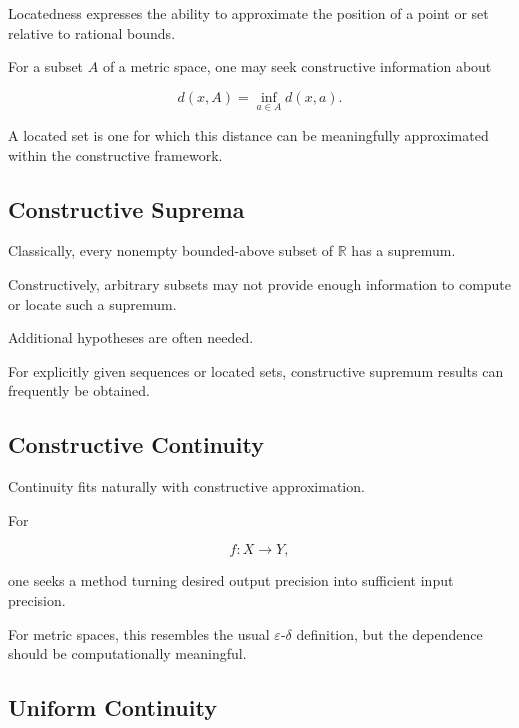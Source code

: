Locatedness expresses the ability to approximate the position of a point or
set relative to rational bounds.

For a subset \(A\) of a metric space, one may seek constructive information
about

\[
\boxed{
d(x,A)
=
\inf_{a\in A}d(x,a).
}
\]

A located set is one for which this distance can be meaningfully
approximated within the constructive framework.

\subsection{Constructive Suprema}
\label{subsec:constructive-suprema}

Classically, every nonempty bounded-above subset of \(\mathbb{R}\) has a
supremum.

Constructively, arbitrary subsets may not provide enough information to
compute or locate such a supremum.

Additional hypotheses are often needed.

For explicitly given sequences or located sets, constructive supremum
results can frequently be obtained.

\subsection{Constructive Continuity}
\label{subsec:constructive-continuity}

Continuity fits naturally with constructive approximation.

For

\[
f:X\to Y,
\]

one seeks a method turning desired output precision into sufficient input
precision.

For metric spaces, this resembles the usual \(\varepsilon\)-\(\delta\)
definition, but the dependence should be computationally meaningful.

\subsection{Uniform Continuity}
\label{subsec:constructive-uniform-continuity}

